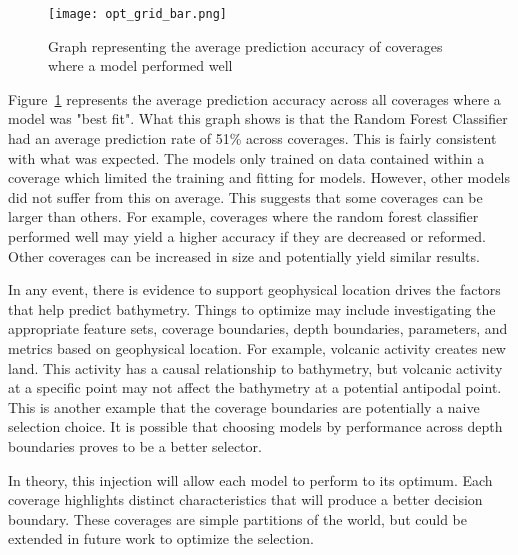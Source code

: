 \begin{figure}[htp]
    \centering
    \texttt{[image: opt\_grid\_bar.png]}
    \caption{Graph representing the average prediction accuracy of coverages where a model performed well}
    \label{fig:grid_opt_graph}
\end{figure}

\par
Figure~\ref{fig:grid_opt_graph} represents the average prediction accuracy across all coverages where a model was "best fit".
What this graph shows is that the Random Forest Classifier had an average prediction rate of 51\% across coverages.
This is fairly consistent with what was expected. 
The models only trained on data contained within a coverage which limited the training and fitting for models. 
However, other models did not suffer from this on average.
This suggests that some coverages can be larger than others.
For example, coverages where the random forest classifier performed well may yield a higher accuracy if they are decreased or reformed.
Other coverages can be increased in size and potentially yield similar results.


\par
In any event, there is evidence to support geophysical location drives the factors that help predict bathymetry.
Things to optimize may include investigating the appropriate feature sets, coverage boundaries, depth boundaries, parameters, and metrics based on geophysical location.
For example, volcanic activity creates new land.
This activity has a causal relationship to bathymetry, but volcanic activity at a specific point may not affect the bathymetry at a potential antipodal point.
This is another example that the coverage boundaries are potentially a naive selection choice.
It is possible that choosing models by performance across depth boundaries proves to be a better selector.
\par
In theory, this injection will allow each model to perform to its optimum.
Each coverage highlights distinct characteristics that will produce a better decision boundary.
These coverages are simple partitions of the world, but could be extended in future work to optimize the selection.



